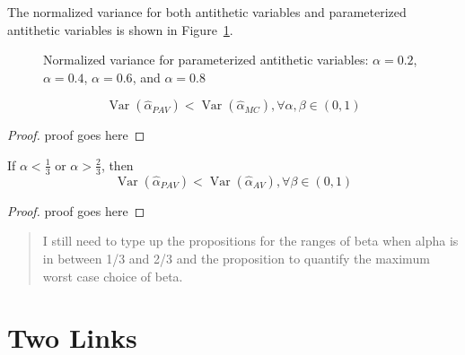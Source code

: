 \documentclass[11pt]{article}
\DeclareMathOperator{\var}{Var}
\begin{document}
The normalized variance for both antithetic variables and parameterized antithetic variables is shown in Figure~\ref{fig:pav}.
\begin{figure}[ht!]
\centering
{}
\label{fig:subfigureExample}
\caption[Normalized variance for parameterized antithetic variables]{Normalized variance for parameterized antithetic variables:  $\alpha = 0.2$,  $\alpha = 0.4$,  $\alpha = 0.6$, and  $\alpha = 0.8$}\label{fig:pav}
\end{figure}

\begin{proposition}
\[
\var\left(\hat{\alpha}_{PAV}\right) < \var\left(\hat{\alpha}_{MC}\right), \forall \alpha,\beta \in (0,1)
\]
\end{proposition}
\begin{proof}
proof goes here
\end{proof}
\begin{proposition}
If $\alpha < \frac{1}{3}$ or $\alpha > \frac{2}{3}$, then
\[
\var\left(\hat{\alpha}_{PAV}\right) < \var\left(\hat{\alpha}_{AV}\right), \forall \beta \in (0,1)
\]
\end{proposition}
\begin{proof}
proof goes here
\end{proof}

\begin{quote}
I still need to type up the propositions for the ranges of beta when alpha is in between 1/3 and 2/3 and the proposition to quantify the maximum worst case choice of beta.
\end{quote}

\section{Two Links}
\end{document}
